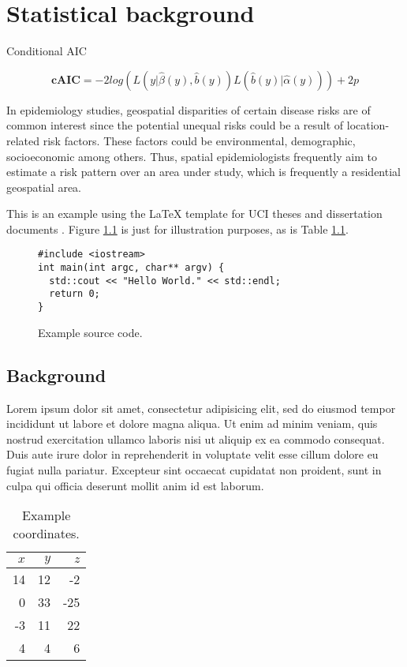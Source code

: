 \chapter{Statistical background}

Conditional AIC

\begin{equation}
\textbf{cAIC}=-2log(L(y|\hat{\beta}(y),\hat{b}(y))L(\hat{b}(y)|\hat{\alpha}(y)))+2p
\end{equation}


In epidemiology studies, geospatial disparities of certain disease risks are of common interest since the potential unequal risks could be a result of location-related risk factors. These factors could be environmental, demographic, socioeconomic among others. Thus, spatial epidemiologists frequently aim to estimate a risk pattern over an area under study, which is frequently a residential geospatial area. 

This is an example using the \LaTeX{} template for UCI theses and
dissertation documents \cite{uci-thesis-latex}. Figure
\ref{fig:sourcecode} is just for illustration purposes, as is Table
\ref{tab:coordinates}.

\begin{figure}
\begin{verbatim}
#include <iostream>
int main(int argc, char** argv) {
  std::cout << "Hello World." << std::endl;
  return 0;
}
\end{verbatim}
  \caption{Example source code.}
  \label{fig:sourcecode}
\end{figure}

\section{Background}

Lorem ipsum dolor sit amet, consectetur adipisicing elit, sed do
eiusmod tempor incididunt ut labore et dolore magna aliqua. Ut enim ad
minim veniam, quis nostrud exercitation ullamco laboris nisi ut
aliquip ex ea commodo consequat. Duis aute irure dolor in
reprehenderit in voluptate velit esse cillum dolore eu fugiat nulla
pariatur. Excepteur sint occaecat cupidatat non proident, sunt in
culpa qui officia deserunt mollit anim id est laborum.

\begin{table}
  \centering
  \begin{tabular}{|rr|r|}
    \hline
    $x$ & $y$ & $z$ \\
    \hline
    14 & 12 & -2 \\
    0 & 33 & -25 \\
    -3 & 11 & 22 \\
    4 & 4 & 6 \\
    \hline
  \end{tabular}
  \caption{Example coordinates.}
  \label{tab:coordinates}
\end{table}


